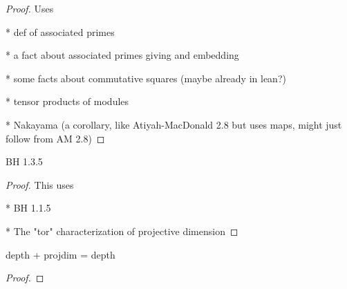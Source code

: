 \begin{proof}
  Uses

  * def of associated primes

  * a fact about associated primes giving and embedding

  * some facts about commutative squares (maybe already in lean?)

  * tensor products of modules

  * Nakayama (a corollary, like Atiyah-MacDonald 2.8 
    but uses maps, might just follow from AM 2.8)
\end{proof}

\begin{lemma}
  \label{lem:projdim_preserved_quotient_reg_elt}
  BH 1.3.5
\end{lemma}

\begin{proof}
  This uses 

  * BH 1.1.5

  * The "tor" characterization of projective dimension

\end{proof}

\begin{theorem}
  \label{thm:auslander_buchsbaum_formula}
  depth + projdim = depth
\end{theorem}

\begin{proof}
\end{proof}



